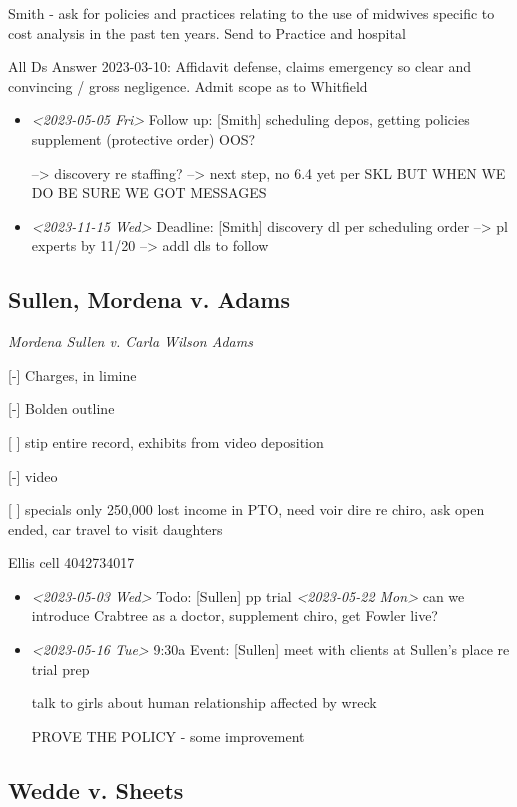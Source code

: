 \documentclass[11pt]{article}
\begin{document}
Smith - ask for policies and practices relating to the use of midwives specific to cost analysis in the past ten years. Send to Practice and hospital

All Ds Answer 2023-03-10: Affidavit defense, claims emergency so clear and convincing / gross negligence. Admit scope as to Whitfield

\begin{itemize}
\item \textit{<2023-05-05 Fri> } Follow up: [Smith] scheduling depos, getting policies supplement (protective order) OOS?

--> discovery re staffing? --> next step, no 6.4 yet per SKL BUT WHEN WE DO BE SURE WE GOT MESSAGES

\item \textit{<2023-11-15 Wed> } Deadline: [Smith] discovery dl per scheduling order --> pl experts by 11/20 --> addl dls to follow
\end{itemize}

\subsection*{Sullen, Mordena v. Adams}
\label{sec:org56cd840}

\emph{Mordena Sullen v. Carla Wilson Adams}

[-] Charges, in limine

[-] Bolden outline

[ ] stip entire record, exhibits from video deposition

[-] video

[ ] specials only 250,000 lost income in PTO, need voir dire re chiro, ask open ended, car travel to visit daughters

Ellis cell 4042734017

\begin{itemize}
\item \textit{<2023-05-03 Wed> } Todo: [Sullen] pp trial \textit{<2023-05-22 Mon> } can we introduce Crabtree as a doctor, supplement chiro, get Fowler live?

\item \textit{<2023-05-16 Tue> } 9:30a Event: [Sullen] meet with clients at Sullen's place re trial prep

talk to girls about human relationship affected by wreck

PROVE THE POLICY - some improvement
\end{itemize}

\subsection*{Wedde v. Sheets}
\label{sec:orgf31a4e6}
\end{document}
